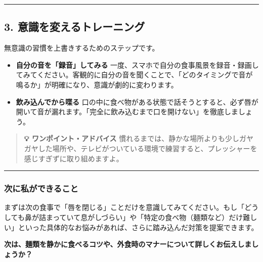 \documentclass[
]{article}
\providecommand{\tightlist}{%
  \setlength{\itemsep}{0pt}\setlength{\parskip}{0pt}}
\begin{document}
\begin{center}\rule{0.5\linewidth}{0.5pt}\end{center}

\subsection{3.
意識を変えるトレーニング}\label{ux610fux8b58ux3092ux5909ux3048ux308bux30c8ux30ecux30fcux30cbux30f3ux30b0}

無意識の習慣を上書きするためのステップです。

\begin{itemize}
\tightlist
\item
  \textbf{自分の音を「録音」してみる}
  一度、スマホで自分の食事風景を録音・録画してみてください。客観的に自分の音を聞くことで、「どのタイミングで音が鳴るか」が明確になり、意識が劇的に変わります。
\item
  \textbf{飲み込んでから喋る}
  口の中に食べ物がある状態で話そうとすると、必ず唇が開いて音が漏れます。「完全に飲み込むまで口を開けない」を徹底しましょう。
\end{itemize}

\begin{quote}
\textbf{💡 ワンポイント・アドバイス}
慣れるまでは、静かな場所よりも少しガヤガヤした場所や、テレビがついている環境で練習すると、プレッシャーを感じすぎずに取り組めますよ。
\end{quote}

\begin{center}\rule{0.5\linewidth}{0.5pt}\end{center}

\subsubsection{次に私ができること}\label{ux6b21ux306bux79c1ux304cux3067ux304dux308bux3053ux3068}

まずは次の食事で「唇を閉じる」ことだけを意識してみてください。もし「どうしても鼻が詰まっていて息がしづらい」や「特定の食べ物（麺類など）だけ難しい」といった具体的なお悩みがあれば、さらに踏み込んだ対策を提案できます。

\textbf{次は、麺類を静かに食べるコツや、外食時のマナーについて詳しくお伝えしましょうか？}
\end{document}
